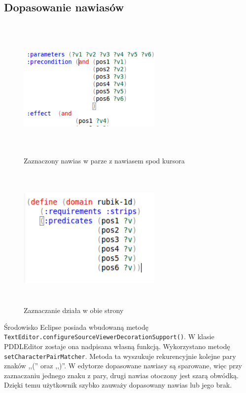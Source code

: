 \subsection{Dopasowanie nawiasów}
\begin{figure}[h]
  \centering
    \includegraphics[width=7cm,height=7cm,keepaspectratio]{img/matched-bracket.png}
    \caption{Zaznaczony nawias w parze z nawiasem spod kursora}
    \label{matched_bracket}
\end{figure}
\begin{figure}[h]
  \centering
    \includegraphics[width=7cm,height=7cm,keepaspectratio]{img/matched-bracket-reverse.png}
    \caption{Zaznaczanie działa w obie strony}
    \label{matched_bracket_reverse}
\end{figure}
Środowisko Eclipse posiada wbudowaną metodę \texttt{TextEditor.configureSourceViewerDecorationSupport()}. W klasie PDDLEditor zostaje ona nadpisana własną funkcją. Wykorzystano metodę \texttt{setCharacterPairMatcher}. Metoda ta wyszukuje rekurencyjnie kolejne pary znaków ,,('' oraz ,,)''.  W edytorze dopasowane nawiasy są sparowane, więc przy zaznaczaniu jednego znaku z pary, drugi nawias otoczony jest szarą obwódką. Dzięki temu użytkownik szybko zauważy dopasowany nawias lub jego brak.
